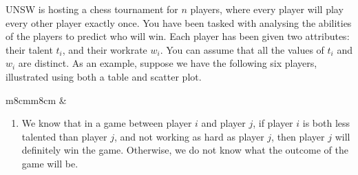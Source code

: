 \documentclass[12pt]{article}
\begin{document}
\begin{question}
UNSW is hosting a chess tournament for $n$ players, where every player will play every other player exactly once. You have been tasked with analysing the abilities of the players to predict who will win. Each player has been given two attributes: their talent $t_i$, and their workrate $w_i$.
You can assume that all the values of $t_i$ and $w_i$ are distinct. As an example, suppose we have the following six players, illustrated using both a table and scatter plot.

\begin{center}
\renewcommand{\arraystretch}{1.3}
\begin{tabular}{m{8cm}m{8cm}}
&{}
\end{tabular}
\end{center}

\begin{enumerate}[label = (\alph*)]
    \item \label{part a} We know that in a game between player $i$ and player $j$, if player $i$ is both less talented than player $j$, and not working as hard as player $j$, then player $j$ will definitely win the game. Otherwise, we do not know what the outcome of the game will be. 
    

\end{enumerate}
\end{question}
\end{document}
